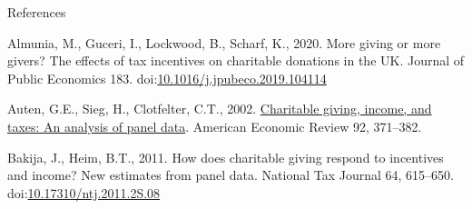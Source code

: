 \documentclass[
  ignorenonframetext,
  aspectratio=169,
]{beamer}
\newlength{\cslhangindent}
\newlength{\cslentryspacingunit} %
\newenvironment{CSLReferences}[2] %
 {%
  \setlength{\parindent}{0pt}
  \ifodd #1
  \let\oldpar\par
  \def\par{\hangindent=\cslhangindent\oldpar}
  \fi
  \setlength{\parskip}{#2\cslentryspacingunit}
 }%
 {}
\begin{document}
\begin{frame}{References}
\protect\hypertarget{references}{}
\hypertarget{refs}{}
\begin{CSLReferences}{1}{0}
\leavevmode{}%
Almunia, M., Guceri, I., Lockwood, B., Scharf, K., 2020. More giving or more givers? The effects of tax incentives on charitable donations in the UK. Journal of Public Economics 183. doi:\href{https://doi.org/10.1016/j.jpubeco.2019.104114}{10.1016/j.jpubeco.2019.104114}

\leavevmode{}%
Auten, G.E., Sieg, H., Clotfelter, C.T., 2002. \href{http://www.jstor.org/stable/3083340}{Charitable giving, income, and taxes: An analysis of panel data}. American Economic Review 92, 371--382.

\leavevmode{}%
Bakija, J., Heim, B.T., 2011. How does charitable giving respond to incentives and income? New estimates from panel data. National Tax Journal 64, 615--650. doi:\href{https://doi.org/10.17310/ntj.2011.2S.08}{10.17310/ntj.2011.2S.08}

\end{CSLReferences}
\end{frame}
\end{document}
